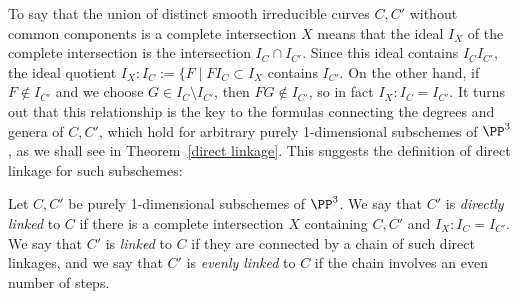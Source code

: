 %
%



To say that the union of distinct smooth irreducible curves $C, C'$ without common components is a complete intersection $X$ means that 
the ideal $I_X$ of the complete intersection is the intersection $I_C\cap I_{C'}$. Since this ideal contains $I_CI_{C'}$, the ideal quotient
$I_X:I_C:= \{F \mid FI_C\subset I_X$
contains $I_{C'}$. On the other hand, if $F \notin I_{C'}$ and we choose $G\in I_C\setminus I_{C'}$, then $FG\notin I_{C'}$, so in fact
$I_X:I_C = I_{C'}$. It turns out that this relationship is the key to the formulas connecting the degrees and genera of $C,C'$, which hold 
for arbitrary purely 1-dimensional subschemes of $\PP^3$, as we shall see in Theorem~\ref{direct linkage}. This suggests the definition
of direct linkage for such subschemes:

\begin{definition}
Let $C,C'$ be purely 1-dimensional subschemes of $\PP^3$. We say that $C'$ is \emph{directly linked} to $C$ if there is a complete
intersection $X$ containing $C,C'$ and $I_X:I_C = I_{C'}$. We say that $C'$ is \emph{linked} to $C$ if they are connected by a chain of such
direct linkages, and we say that $C'$ is \emph{evenly linked} to $C$ if the chain involves an even number of steps.
\end{definition}


